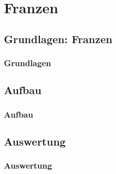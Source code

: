
\section{Franzen}
\subsection{Grundlagen: Franzen}
\begin{frame}
\frametitle{Grundlagen}
  
\end{frame}

\subsection{Aufbau}
\begin{frame}
\frametitle{Aufbau}
  
\end{frame}

\subsection{Auswertung}
\begin{frame}
\frametitle{Auswertung}
  
\end{frame}